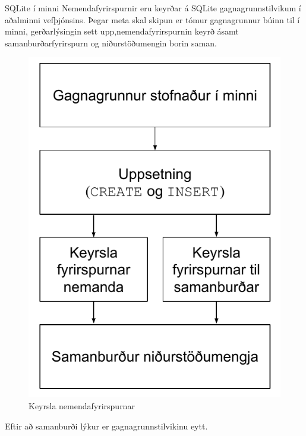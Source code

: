 \documentclass[final]{beamer}
\begin{document}
\begin{frame}
\begin{tcolorbox}[standard jigsaw, height=97cm, colframe=orange, opacityback=0, sharp corners=all]
\begin{columns}[t]
\begin{column}{.47\linewidth}
\begin{block}{SQLite í minni}
Nemendafyrirspurnir eru keyrðar á SQLite gagnagrunnstilvikum í aðalminni vefþjónsins. Þegar meta skal skipun er tómur gagnagrunnur búinn til í minni, gerðarlýsingin sett upp,nemendafyrirspurnin keyrð ásamt samanburðarfyrirspurn og niðurstöðumengin borin saman.
\begin{figure}
    \caption{Keyrsla nemendafyrirspurnar}
    \begin{center}
    \includegraphics[width=\linewidth]{keyrsla-fyrirspurnar}
\end{center}
\end{figure}

Eftir að samanburði lýkur er gagnagrunnstilvikinu eytt.
\end{block}
\end{column}

\end{columns}
\end{tcolorbox}
\end{frame}
\end{document}
